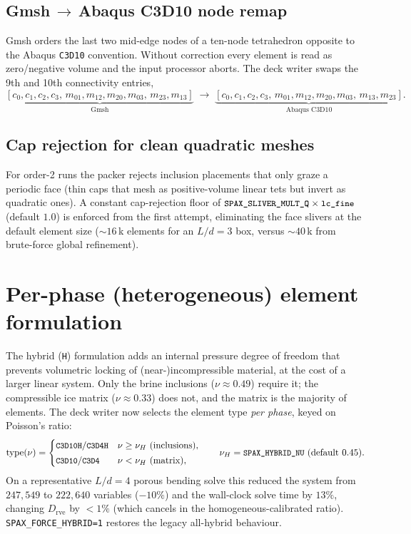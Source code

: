 \documentclass[11pt]{article}
\newcommand{\code}[1]{\texttt{\small #1}}
\newcommand{\env}[1]{\texttt{\small #1}}
\begin{document}
\subsection{Gmsh\,$\rightarrow$\,Abaqus C3D10 node remap}
Gmsh orders the last two mid-edge nodes of a ten-node tetrahedron opposite to
the Abaqus \code{C3D10} convention. Without correction every element is read as
zero/negative volume and the input processor aborts. The deck writer swaps the
9th and 10th connectivity entries,
\[
\underbrace{[c_0,c_1,c_2,c_3,\,m_{01},m_{12},m_{20},m_{03},\,m_{23},m_{13}]}_{\text{Gmsh}}
\;\longrightarrow\;
\underbrace{[c_0,c_1,c_2,c_3,\,m_{01},m_{12},m_{20},m_{03},\,m_{13},m_{23}]}_{\text{Abaqus C3D10}} .
\]

\subsection{Cap rejection for clean quadratic meshes}
For order-2 runs the packer rejects inclusion placements that only graze a
periodic face (thin caps that mesh as positive-volume linear tets but invert as
quadratic ones). A constant cap-rejection floor of
$\env{SPAX\_SLIVER\_MULT\_Q}\times\code{lc\_fine}$ (default $1.0$) is enforced
from the first attempt, eliminating the face slivers at the default element size
($\sim 16$\,k elements for an $L/d{=}3$ box, versus $\sim 40$\,k from brute-force
global refinement).

\section{Per-phase (heterogeneous) element formulation}
\label{sec:hybrid}
The hybrid (\code{H}) formulation adds an internal pressure degree of freedom
that prevents volumetric locking of (near-)incompressible material, at the cost
of a larger linear system. Only the brine inclusions ($\nu\!\approx\!0.49$)
require it; the compressible ice matrix ($\nu\!\approx\!0.33$) does not, and the
matrix is the majority of elements. The deck writer now selects the element type
\emph{per phase}, keyed on Poisson's ratio:
\begin{equation}
  \text{type}(\nu)=
  \begin{cases}
     \code{C3D10H}/\code{C3D4H} & \nu \ge \nu_{H}\ (\text{inclusions}),\\[2pt]
     \code{C3D10}/\code{C3D4}   & \nu < \nu_{H}\ (\text{matrix}),
  \end{cases}
  \qquad \nu_H=\env{SPAX\_HYBRID\_NU}\ (\text{default }0.45).
\end{equation}
On a representative $L/d{=}4$ porous bending solve this reduced the system from
$247{,}549$ to $222{,}640$ variables ($-10\%$) and the wall-clock solve time by
$13\%$, changing $D_\text{rve}$ by $<\!1\%$ (which cancels in the
homogeneous-calibrated ratio). \env{SPAX\_FORCE\_HYBRID=1} restores the legacy
all-hybrid behaviour.
\end{document}

